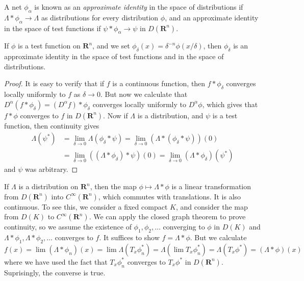 A net $\phi_\alpha$ is known as an {\it approximate identity} in the space of distributions if $\Lambda * \phi_\alpha \to \Lambda$ as distributions for every distribution $\phi$, and an approximate identity in the space of test functions if $\psi * \phi_\alpha \to \psi$ in $D(\mathbf{R}^n)$.

\begin{theorem}
    If $\phi$ is a test function on $\mathbf{R}^n$, and we set $\phi_\delta(x) = \delta^{-n} \phi(x/\delta)$, then $\phi_\delta$ is an approximate identity in the space of test functions and in the space of distributions.
\end{theorem}
\begin{proof}
    It is easy to verify that if $f$ is a continuous function, then $f * \phi_\delta$ converges locally uniformly to $f$ as $\delta \to 0$. But now we calculate that $D^\alpha(f * \phi_\delta) = (D^\alpha f) * \phi_\delta$ converges locally uniformly to $D^\alpha \phi$, which gives that $f * \phi$ converges to $f$ in $D(\mathbf{R}^n)$. Now if $\Lambda$ is a distribution, and $\psi$ is a test function, then continuity gives
    \begin{align*}
        \Lambda(\psi^*) &= \lim_{\delta \to 0} \Lambda(\phi_\delta * \psi) = \lim_{\delta \to 0} (\Lambda * (\phi_\delta * \psi))(0)\\
        &= \lim_{\delta \to 0} ((\Lambda * \phi_\delta) * \psi)(0) = \lim_{\delta \to 0} (\Lambda * \phi_\delta)(\psi^*)
    \end{align*}
    and $\psi$ was arbitrary.
\end{proof}

If $\Lambda$ is a distribution on $\mathbf{R}^n$, then the map $\phi \mapsto \Lambda * \phi$ is a linear transformation from $D(\mathbf{R}^n)$ into $C^\infty(\mathbf{R}^n)$, which commutes with translations. It is also continuous. To see this, we consider a fixed compact $K$, and consider the map from $D(K)$ to $C^\infty(\mathbf{R}^n)$. We can apply the closed graph theorem to prove continuity, so we assume the existence of $\phi_1, \phi_2, \dots$ converging to $\phi$ in $D(K)$ and $\Lambda * \phi_1, \Lambda * \phi_2, \dots$ converges to $f$. It suffices to show $f = \Lambda * \phi$. But we calculate
%
\[ f(x) = \lim (\Lambda * \phi_n)(x) = \lim \Lambda(T_x \phi^*_n) = \Lambda (\lim T_x \phi^*_n) = \Lambda(T_x \phi^*) = (\Lambda * \phi)(x) \]
%
where we have used the fact that $T_x \phi_n^*$ converges to $T_x \phi^*$ in $D(\mathbf{R}^n)$. Suprisingly, the converse is true.


